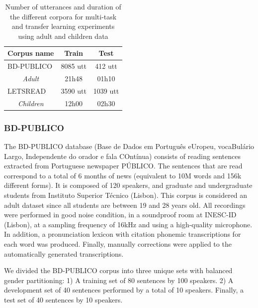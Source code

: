 \begin{table}[h]
\begin{center}
\begin{tabular}{lcc}
\hline
Corpus name      & Train & Test  \\ \hline
\multicolumn{1}{l}{BD-PUBLICO}             & 8085 utt  & 412 utt  \\ 
\multicolumn{1}{c}{\textit{Adult}}              & 21h48 & 01h10 \\\hline
\multicolumn{1}{l}{LETSREAD}     & 3590 utt & 1039 utt \\ 
\multicolumn{1}{c}{\textit{Children}}     & 12h00 & 02h30 \\  \hline
\end{tabular}
\caption{Number of utterances and duration of the different corpora for multi-task and transfer learning experiments using adult and children data}
\label{tab:statistics_exp1}
\end{center}
\end{table}

\subsubsection*{BD-PUBLICO}
The BD-PUBLICO database (Base de Dados em Português eUropeu, vocaBulário Largo, Independente do orador e fala COntínua) \cite{bdpublico} consists of reading sentences extracted from Portuguese newspaper PÚBLICO. The sentences that are read correspond to a total of 6 months of news (equivalent to 10M words and 156k different forms). It is composed of 120 speakers, and graduate and undergraduate students from Instituto Superior Técnico (Lisbon). This corpus is considered an adult dataset since all students are between 19 and 28 years old. All recordings were performed in good noise condition, in a soundproof room at INESC-ID (Lisbon), at a sampling frequency of 16kHz and using a high-quality microphone. In addition, a pronunciation lexicon with citation phonemic transcriptions for each word was produced. Finally, manually corrections were applied to the automatically generated transcriptions. 

We divided the BD-PUBLICO corpus into three unique sets with balanced gender partitioning: 1) A training set of 80 sentences by 100 speakers. 2) A development set of 40 sentences performed by a total of 10 speakers. Finally, a test set of 40 sentences by 10 speakers.

